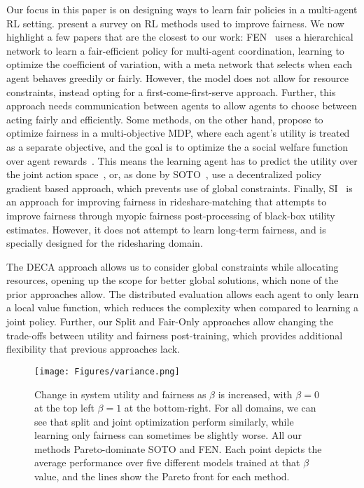 Our focus in this paper is on designing ways to learn fair policies in a multi-agent RL setting. \citet{FairRLSurvey} present a survey on RL methods used to improve fairness. We now highlight a few papers that are the closest to our work: FEN~\citep{jiang2019FEN} uses a hierarchical network to learn a fair-efficient policy for multi-agent coordination, learning to optimize the coefficient of variation, with a meta network that selects when each agent behaves greedily or fairly. However, the model does not allow for resource constraints, instead opting for a first-come-first-serve approach. Further, this approach needs communication between agents to allow agents to choose between acting fairly and efficiently. Some methods, on the other hand, propose to optimize fairness in a multi-objective MDP, where each agent's utility is treated as a separate objective, and the goal is to optimize the a social welfare function over agent rewards~\citep{zimmer2021MOMDP,siddique2020MOMDP}. 
This means the learning agent has to predict the utility over the joint action space~\citep{siddique2020MOMDP}, or, as done by SOTO~\citep{zimmer2021MOMDP}, use a decentralized policy gradient based approach, which prevents use of global constraints. 
Finally, SI~\citep{SI_kumar2023} is an approach for improving fairness in rideshare-matching that attempts to improve fairness through myopic fairness post-processing of black-box utility estimates. However, it does not attempt to learn long-term fairness, and is specially designed for the ridesharing domain.

The DECA approach allows us to consider global constraints while allocating resources, opening up the scope for better global solutions, which none of the prior approaches allow. The distributed evaluation allows each agent to only learn a local value function, which reduces the complexity when compared to learning a joint policy. Further, our Split and Fair-Only approaches allow changing the trade-offs between utility and fairness post-training, which provides additional flexibility that previous approaches lack. 




\begin{figure*}[ht]
    \centering
    \texttt{[image: Figures/variance.png]}
    \caption{Change in system utility and fairness as $\beta$ is increased, with $\beta=0$ at the top left $\beta=1$ at the bottom-right. For all domains, we can see that split and joint optimization perform similarly, while learning only fairness can sometimes be slightly worse. All our methods Pareto-dominate SOTO and FEN. Each point depicts the average performance over five different models trained at that $\beta$ value, and the lines show the Pareto front for each method.}
    \label{fig:main_results}
\end{figure*}